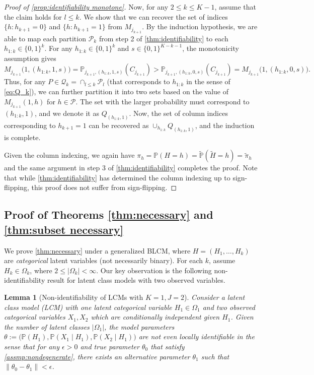 \documentclass[10pt]{article} %
\newtheorem{lemma}{Lemma}
\newcommand{\PP}{\mathbb P}
\def\tilde{\widetilde}
\begin{document}
\begin{proof}[Proof of \cref{prop:identifiability monotone}]
    Now, for any $2 \le k \le K-1$, assume that the claim holds for $l \le k$. We show that we can recover the set of indices $\{h: {h}_{k+1}=0\}$ and $\{h: {h}_{k+1}=1\}$ from $M_{j_{k+1}}$. By the induction hypothesis, we are able to map each partition $\mathcal{P}_k$ from step 2 of \cref{thm:identifiability} to each $h_{1:k} \in \{0,1\}^k$.
    For any $h_{1:k} \in \{0,1\}^k$ and $s \in \{0,1\}^{K-k-1}$, the monotonicity assumption gives
    $$M_{j_{k+1}}\Big(1, (h_{1:k}, 1, s)\Big) = \PP_{j_{k+1},(h_{1:k}, 1, s)}(C_{j_{k+1}}) > \PP_{j_{k+1},(h_{1:k}, 0, s)}(C_{j_{k+1}}) = M_{j_{k+1}}\Big(1, (h_{1:k}, 0, s)\Big).$$
    Thus, for any $P \in \mathcal{Q}_k = \cap_{l \le k} \mathcal{P}_l$ (that corresponds to $h_{1:k}$ in the sense of \eqref{eq:Q_k}), we can further partition it into two sets based on the value of $M_{j_{k+1}}(1,h)$ for $h \in \mathcal{P}$. The set with the larger probability must correspond to $(h_{1:k}, 1)$, and we denote it as $Q_{(h_{1:k}, 1)}$.
    Now, the set of column indices corresponding to $h_{k+1} = 1$ can be recovered as $\cup_{h_{1:k}} Q_{(h_{1:k}, 1)}$, and the induction is complete.
    
    Given the column indexing, we again have $\pi_h = \PP(H=h) = \tilde{\PP}(\tilde{H}=h) = \tilde{\pi}_h$ and the same argument in step 3 of \cref{thm:identifiability} completes the proof. Note that while \cref{thm:identifiability} has determined the column indexing up to sign-flipping, this proof does not suffer from sign-flipping.
\end{proof}

\subsection{Proof of Theorems \ref{thm:necessary} and \ref{thm:subset necessary}}
%
%
%
%

%
%
%
We prove \cref{thm:necessary} under a generalized BLCM, where $H = (H_1, \ldots, H_k)$ are \emph{categorical} latent variables (not necessarily binary). For each $k$, assume $H_k \in \Omega_k$, where $2 \le |\Omega_k| < \infty$. Our key observation is the following non-identifiability result for latent class models with two observed variables.

\begin{lemma}[Non-identifiability of LCMs with $K=1, J=2$]\label{lem:product mixture nonidentifiable}
    Consider a latent class model (LCM) with one latent categorical variable $H_1 \in \Omega_1$ and two observed categorical variables $X_1, X_2$ which are conditionally independent given $H_1$. Given the number of latent classes $|\Omega_1|$, the model parameters $\theta := \big(\PP(H_1), \PP(X_1 \mid H_1), \PP(X_2 \mid H_1)\big)$ are not even locally identifiable in the sense that for any $\epsilon > 0$ and true parameter $\theta_0$ that satisfy \cref{assmp:nondegenerate}, there exists an alternative parameter $\theta_1$ such that $\|\theta_0-\theta_1\| < \epsilon$.
\end{lemma}
\end{document}
